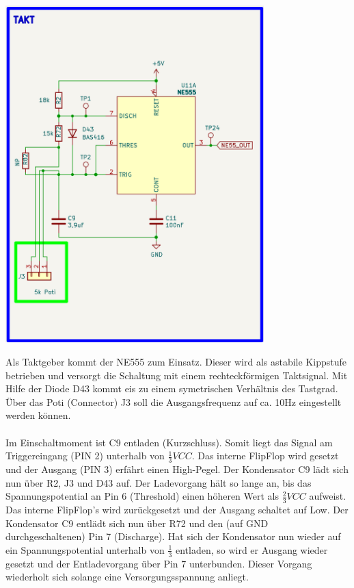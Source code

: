 \begin{center}
\includegraphics[width=10cm]{Bilder/Takt.png}
\end{center}

Als Taktgeber kommt der \glqq NE555 \grqq{} zum Einsatz. Dieser wird als astabile Kippstufe betrieben und versorgt die Schaltung mit einem rechteckförmigen Taktsignal. Mit Hilfe der Diode D43 kommt eis zu einem symetrischen Verhältnis des Tastgrad. Über das Poti (Connector) J3 soll die Ausgangsfrequenz auf ca. 10Hz eingestellt werden können. 
\\
\\
Im Einschaltmoment ist C9 entladen (Kurzschluss). Somit liegt das Signal am Triggereingang (PIN 2) unterhalb von $\frac{1}{3} VCC$. Das interne FlipFlop wird gesetzt und der Ausgang (PIN 3) erfährt einen High-Pegel. Der Kondensator C9 lädt sich nun über R2, J3 und D43 auf. Der Ladevorgang hält so lange an, bis das Spannungspotential an Pin 6 (Threshold) einen höheren Wert als $\frac{2}{3} VCC$ aufweist. Das interne FlipFlop's wird zurückgesetzt und der Ausgang schaltet auf Low. Der Kondensator C9 entlädt sich nun über R72 und den (auf GND durchgeschaltenen) Pin 7 (Discharge). Hat sich der Kondensator nun wieder auf ein Spannungspotential unterhalb von $\frac{1}{3}$ entladen, so wird er Ausgang wieder gesetzt und der Entladevorgang über Pin 7 unterbunden. Dieser Vorgang wiederholt sich solange eine Versorgungsspannung anliegt. 

